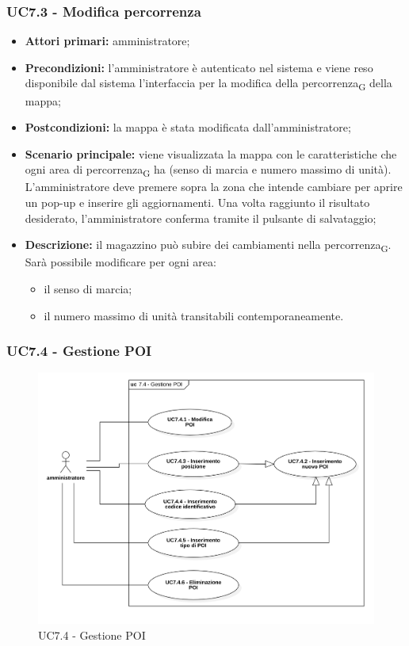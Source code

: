 \subsubsection{UC7.3 - Modifica percorrenza}
\begin{itemize}
	\item 	\textbf{Attori primari:} amministratore;
	\item 	\textbf{Precondizioni:}  l'amministratore è autenticato nel sistema e viene reso disponibile dal sistema l'interfaccia per la modifica della percorrenza\textsubscript{G} della mappa;
	\item 	\textbf{Postcondizioni:} la mappa è stata modificata dall'amministratore;
	\item 	\textbf{Scenario principale:} viene visualizzata la mappa con le caratteristiche che ogni area di percorrenza\textsubscript{G} ha (senso di marcia e numero massimo di unità). L'amministratore deve premere sopra la zona che intende cambiare per aprire un pop-up e inserire gli aggiornamenti. Una volta raggiunto il risultato desiderato, l'amministratore conferma tramite il pulsante di salvataggio;
	\item 	\textbf{Descrizione:} il magazzino può subire dei cambiamenti nella percorrenza\textsubscript{G}. Sarà possibile modificare per ogni area:
	\begin{itemize}
		\item il senso di marcia;
		\item il numero massimo di unità transitabili contemporaneamente.
	\end{itemize}
\end{itemize}

\subsubsection{UC7.4 - Gestione POI}

\begin{figure}[H]
	\centering
	\includegraphics[scale=0.52]{res/images/uc7-4.png}
	\caption{UC7.4 - Gestione POI}
\end{figure}

